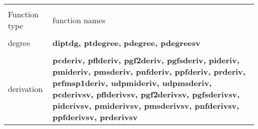 \leer
\begin{center}
\begin{tabular}{|p{1.1in}|p{4.0in}|}
\hline &\\[-1.3ex]
Function type  &
function names\\[1.5ex]
\hline &\\[-1.3ex]

degree &
{\bf diptdg, ptdegree, }\newline
{\bf pdegree, pdegreesv} \\[1.5ex]
\hline &\\[-1.3ex]

derivation &
{\bf pcderiv, pflderiv, pgf2deriv, pgfsderiv, pideriv, \newline
        pmideriv, pmsderiv,  pnfderiv, ppfderiv, prderiv, \newline
        prfmsp1deriv, udpmideriv, udpmsderiv, } \newline
{\bf pcderivsv, pflderivsv, pgf2derivsv, pgfsderivsv, \newline
        piderivsv, pmiderivsv, pmsderivsv, pnfderivsv, \newline
        ppfderivsv, prderivsv } \\[1.5ex]
\hline 
\end{tabular}
\end{center}

\newpage

